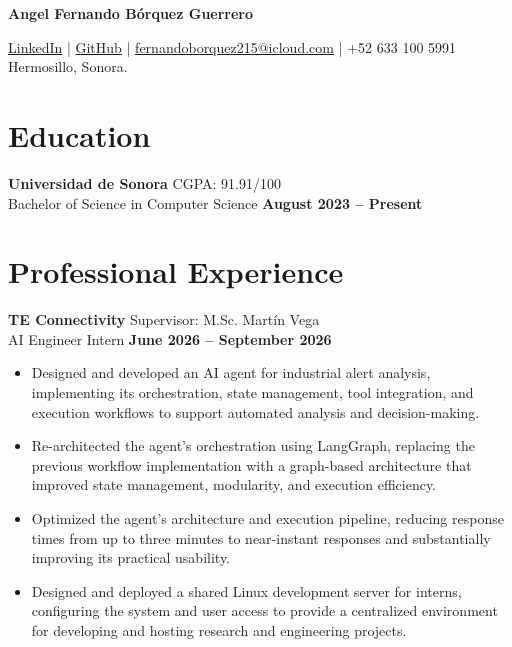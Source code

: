 \documentclass[11pt]{article}
\begin{document}
{\Huge \textbf{Angel Fernando Bórquez Guerrero}} \\
\vspace{-0.4cm}
\par \href{https://www.linkedin.com/in/fernandoborquez/}{LinkedIn} \quad | \quad
\href{https://github.com/FernyBoy}{GitHub} \quad | \quad
\href{mailto:fernandoborquez215@icloud.com}{fernandoborquez215@icloud.com} \quad | \quad
+52 633 100 5991 \\
Hermosillo, Sonora.





\section*{Education}
\textbf{Universidad de Sonora} \hfill CGPA: 91.91/100\\
Bachelor of Science in Computer Science \hfill \textbf{August 2023 -- Present}



\section*{Professional Experience}
\textbf{TE Connectivity} \hfill Supervisor: M.Sc. Martín Vega \\
AI Engineer Intern \hfill \textbf{June 2026 -- September 2026}
\vspace{-0.3cm}
\begin{itemize}[leftmargin=*]
    \item Designed and developed an AI agent for industrial alert analysis, implementing its orchestration, state management, tool integration, and execution workflows to support automated analysis and decision-making.

    \vspace{-0.3cm}
    \item Re-architected the agent's orchestration using LangGraph, replacing the previous workflow implementation with a graph-based architecture that improved state management, modularity, and execution efficiency.

    \vspace{-0.3cm}
    \item Optimized the agent's architecture and execution pipeline, reducing response times from up to three minutes to near-instant responses and substantially improving its practical usability.

    \vspace{-0.3cm}
    \item Designed and deployed a shared Linux development server for interns, configuring the system and user access to provide a centralized environment for developing and hosting research and engineering projects.
\end{itemize}
\end{document}
